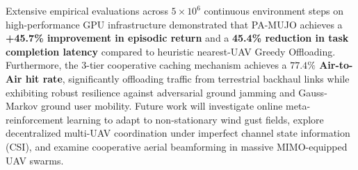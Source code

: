 \documentclass[journal]{IEEEtran}
\begin{document}
Extensive empirical evaluations across $5 \times 10^6$ continuous environment steps on high-performance GPU infrastructure demonstrated that PA-MUJO achieves a \textbf{+45.7\% improvement in episodic return} and a \textbf{45.4\% reduction in task completion latency} compared to heuristic nearest-UAV Greedy Offloading. Furthermore, the 3-tier cooperative caching mechanism achieves a \textbf{$77.4\%$ Air-to-Air hit rate}, significantly offloading traffic from terrestrial backhaul links while exhibiting robust resilience against adversarial ground jamming and Gauss-Markov ground user mobility. Future work will investigate online meta-reinforcement learning to adapt to non-stationary wind gust fields, explore decentralized multi-UAV coordination under imperfect channel state information (CSI), and examine cooperative aerial beamforming in massive MIMO-equipped UAV swarms.




\end{document}
